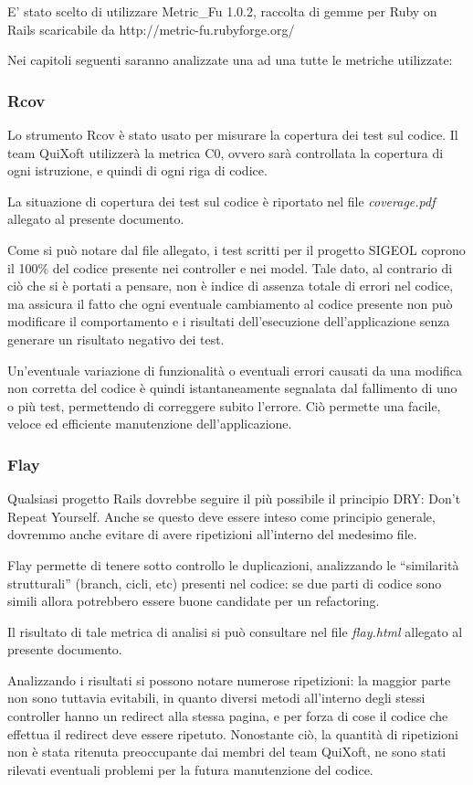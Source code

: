 \documentclass[11pt,a4paper]{article}
\begin{document}
E' stato scelto di utilizzare Metric\_Fu 1.0.2, raccolta di gemme per Ruby on Rails scaricabile da http://metric-fu.rubyforge.org/

Nei capitoli seguenti saranno analizzate una ad una tutte le metriche utilizzate:
\subsubsection{Rcov}
Lo strumento Rcov è stato usato per misurare la copertura dei test sul codice. Il team QuiXoft utilizzerà la metrica C0, ovvero sarà controllata la copertura di ogni istruzione, e quindi di ogni riga di codice.

La situazione di copertura dei test sul codice è riportato nel file \textit{coverage.pdf} allegato al presente documento.

Come si può notare dal file allegato, i test scritti per il progetto SIGEOL coprono il 100\% del codice presente nei controller e nei model.
Tale dato, al contrario di ciò che si è portati a pensare, non è indice di assenza totale di errori nel codice, ma assicura il fatto che ogni eventuale cambiamento al codice presente non può modificare il comportamento e i risultati dell'esecuzione dell'applicazione senza generare un risultato negativo dei test.

Un'eventuale variazione di funzionalità o eventuali errori causati da una modifica non corretta del codice è quindi istantaneamente segnalata dal fallimento di uno o più test, permettendo di correggere subito l'errore. Ciò permette una facile, veloce ed efficiente manutenzione dell'applicazione.
\subsubsection{Flay}
Qualsiasi progetto Rails dovrebbe seguire il più possibile il principio DRY: Don't Repeat Yourself.
Anche se questo deve essere inteso come principio generale, dovremmo anche evitare di avere ripetizioni all’interno del medesimo file.

Flay permette di tenere sotto controllo le duplicazioni, analizzando le “similarità strutturali” (branch, cicli, etc) presenti nel codice: se due parti di codice sono simili allora potrebbero essere buone candidate per un refactoring.

Il risultato di tale metrica di analisi si può consultare nel file \textit{flay.html} allegato al presente documento.

Analizzando i risultati si possono notare numerose ripetizioni: la maggior parte non sono tuttavia evitabili, in quanto diversi metodi all'interno degli stessi controller hanno un redirect alla stessa pagina, e per forza di cose il codice che effettua il redirect deve essere ripetuto.
Nonostante ciò, la quantità di ripetizioni non è stata ritenuta preoccupante dai membri del team QuiXoft, ne sono stati rilevati eventuali problemi per la futura manutenzione del codice.
\end{document}
